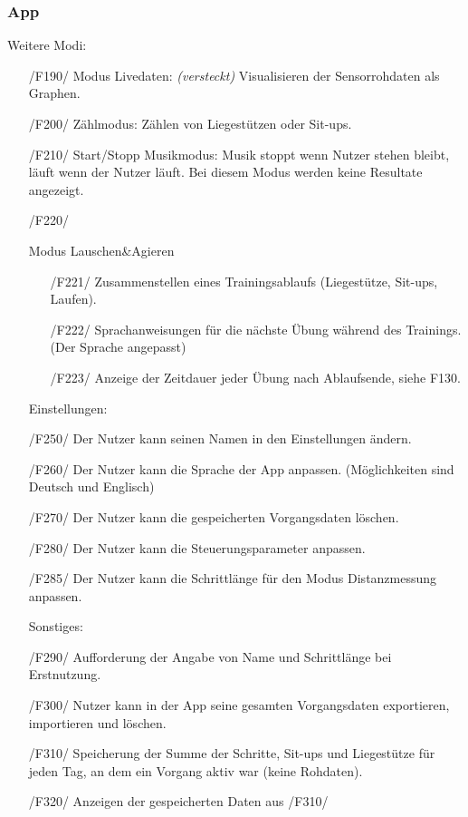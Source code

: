 \documentclass[a4paper,12pt]{article}
\begin{document}
    \subsubsection{App}
      Weitere Modi:
      \begin{itemize}
      \item[/F190/] \textsf{Modus Livedaten: \textit{(versteckt)}} Visualisieren der Sensorrohdaten als Graphen.
      \item[/F200/] \textsf{Zählmodus:} Zählen von Liegestützen oder Sit-ups.
      \item[/F210/] \textsf{Start/Stopp Musikmodus:} Musik stoppt wenn Nutzer stehen bleibt, läuft wenn der Nutzer läuft. Bei diesem Modus werden keine Resultate angezeigt.
      \item[/F220/]{
        Modus \glqq Lauschen\&Agieren\grqq
        \begin{itemize}
          \item[/F221/] Zusammenstellen eines Trainingsablaufs (Liegestütze, Sit-ups, Laufen). 
          \item[/F222/] Sprachanweisungen für die nächste Übung während des Trainings. (Der Sprache angepasst)
          \item[/F223/] Anzeige der Zeitdauer jeder Übung nach Ablaufsende, siehe F130.
        \end{itemize}
      }

      Einstellungen:
      \item[/F250/] Der Nutzer kann seinen Namen in den Einstellungen ändern.
      \item[/F260/] Der Nutzer kann die Sprache der App anpassen. (Möglichkeiten sind Deutsch und Englisch)
      \item[/F270/] Der Nutzer kann die gespeicherten \Gls{Vorgangsdaten} löschen.
      \item[/F280/] Der Nutzer kann die \Gls{Steuerungsparameter} anpassen. 
      \item[/F285/] Der Nutzer kann die Schrittlänge für den Modus Distanzmessung anpassen.
      
      Sonstiges:
      \item[/F290/] Aufforderung der Angabe von Name und Schrittlänge bei Erstnutzung.
      \item[/F300/] Nutzer kann in der App seine gesamten \Gls{Vorgangsdaten} exportieren, importieren und löschen.
      \item[/F310/] Speicherung der Summe der Schritte, Sit-ups und Liegestütze für jeden Tag, an dem ein \Gls{Vorgang} aktiv war (keine \Gls{Rohdaten}).
      \item[/F320/] Anzeigen der gespeicherten Daten aus /F310/
      \end{itemize}
\end{document}
